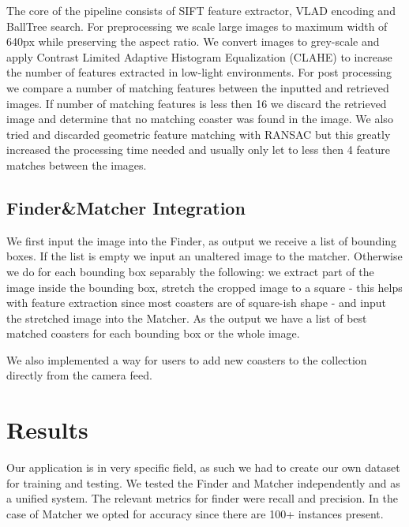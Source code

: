 \documentclass{article}
\begin{document}
The core of the pipeline consists of SIFT feature extractor, VLAD encoding and BallTree search.
For preprocessing we scale large images to maximum width of 640px while preserving the aspect ratio.
We convert images to grey-scale and apply Contrast Limited Adaptive Histogram Equalization (CLAHE) \cite{CLAHE} to increase the number of features extracted in low-light environments. 
For post processing we compare a number of matching features between the inputted and retrieved images.
If number of matching features is less then 16 we discard the retrieved image and determine that no matching coaster was found in the image. 
We also tried and discarded geometric feature matching with RANSAC \cite{RANSAC} but this greatly increased the processing time needed and usually only let to less then 4 feature matches between the images.


\subsection{Finder\&Matcher Integration}

We first input the image into the Finder, as output we receive a list of bounding boxes.
If the list is empty we input an unaltered image to the matcher.
Otherwise we do for each bounding box separably the following: 
we extract part of the image inside the bounding box, 
stretch the cropped image to a square - this helps with feature extraction since most coasters are of square-ish shape - 
and input the stretched image into the Matcher.
As the output we have a list of best matched coasters for each bounding box or the whole image. 

We also implemented a way for users to add new coasters to the collection directly from the camera feed.


\section{Results}
Our application is in very specific field, as such we had to create our own dataset for training and testing.
We tested the Finder and Matcher independently and as a unified system.
The relevant metrics for finder were recall and precision. 
In the case of Matcher we opted for accuracy since there are 100+ instances present.
\end{document}
